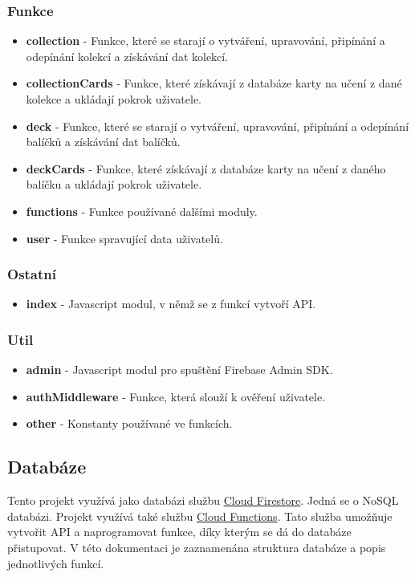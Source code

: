 \documentclass[a4paper,12pt]{article}
\begin{document}
\subsubsection*{Funkce}
\begin{itemize}
\item \textbf{collection} - Funkce, které se starají o vytváření, upravování, připínání a odepínání kolekcí a získávání dat kolekcí.
\item \textbf{collectionCards} - Funkce, které získávají z databáze karty na učení z dané kolekce a ukládají pokrok uživatele.
\item \textbf{deck} - Funkce, které se starají o vytváření, upravování, připínání a odepínání balíčků a získávání dat balíčků.
\item \textbf{deckCards} - Funkce, které získávají z databáze karty na učení z daného balíčku a ukládají pokrok uživatele.
\item \textbf{functions} - Funkce používané dalšími moduly.
\item \textbf{user} - Funkce spravující data uživatelů.
\end{itemize}

\subsubsection*{Ostatní}
\begin{itemize}
\item \textbf{index} - Javascript modul, v němž se z funkcí vytvoří API.
\end{itemize}

\subsubsection*{Util}
\begin{itemize}
\item \textbf{admin} - Javascript modul pro spuštění Firebase Admin SDK.
\item \textbf{authMiddleware} - Funkce, která slouží k ověření uživatele.
\item \textbf{other} - Konstanty používané ve funkcích.
\end{itemize}

\subsection{Databáze}
Tento projekt využívá jako databázi službu \href{https://firebase.google.com/docs/firestore}{Cloud Firestore}. Jedná se o NoSQL databázi. Projekt využívá také službu \href{https://firebase.google.com/docs/functions}{Cloud Functions}. Tato služba umožňuje vytvořit API a naprogramovat funkce, díky kterým se dá do databáze přistupovat. V této dokumentaci je zaznamenána struktura databáze a popis jednotlivých funkcí.
\end{document}
